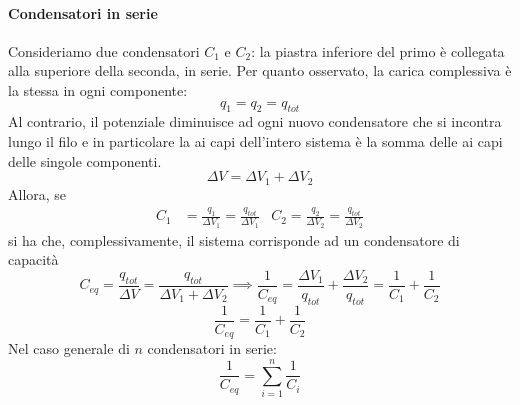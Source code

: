 \paragraph{Condensatori in serie}
Consideriamo due condensatori $C_1$ e $C_2$: la piastra inferiore del primo è collegata alla superiore della seconda, in serie.
Per quanto osservato, la carica complessiva è la stessa in ogni componente:
\begin{equation*}
	q_1=q_2=q_{tot}
\end{equation*}
Al contrario, il potenziale diminuisce ad ogni nuovo condensatore che si incontra lungo il filo e in particolare la \ddp ai capi dell'intero sistema è la somma delle \ddp ai capi delle singole componenti.
\begin{equation*}
	\Delta V=\Delta V_1+\Delta V_2
\end{equation*}
Allora, se
\begin{align*}
	C_1&=\frac{q_1}{\Delta V_1}=\frac{q_{tot}}{\Delta V_1} & C_2=\frac{q_2}{\Delta V_2}=\frac{q_{tot}}{\Delta V_2}
\end{align*}
si ha che, complessivamente, il sistema corrisponde ad un condensatore di capacità
\begin{equation*}
	C_{eq}=\frac{q_{tot}}{\Delta V}=\frac{q_{tot}}{\Delta V_1+\Delta V_2}\implies \frac{1}{C_{eq}}=\frac{\Delta V_1}{q_{tot}}+\frac{\Delta V_2}{q_{tot}}=\frac{1}{C_1}+\frac{1}{C_2}
\end{equation*}
\begin{equation}
	\frac{1}{C_{eq}}=\frac{1}{C_1}+\frac{1}{C_2}
\end{equation}
Nel caso generale di $n$ condensatori in serie:
\begin{equation}
	\frac{1}{C_{eq}}=\sum_{i=1}^{n}\frac{1}{C_i}
\end{equation}
